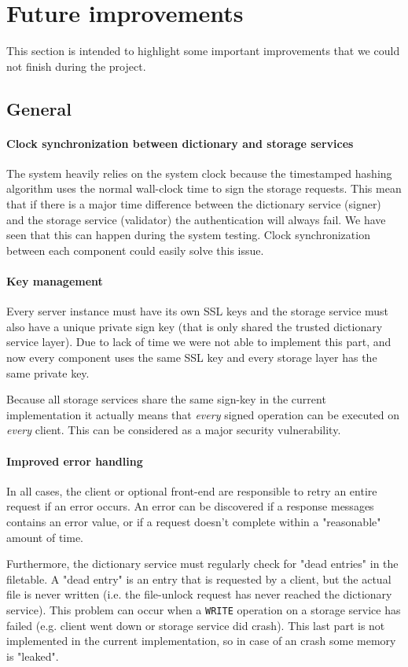 \documentclass[12pt,a4paper]{scrartcl}
\begin{document}
\section{Future improvements}
This section is intended to highlight some important improvements that we could not finish during the project.

\subsection{General}
\paragraph{Clock synchronization between dictionary and storage services}
The system heavily relies on the system clock because the timestamped hashing algorithm uses the normal wall-clock time to sign the storage requests. This mean that if there is a major time difference between the dictionary service (signer) and the storage service (validator) the authentication will always fail. We have seen that this can happen during the system testing. Clock synchronization between each component could easily solve this issue.

\paragraph{Key management}
Every server instance must have its own SSL keys and the storage service must also have a unique private sign key (that is only shared the trusted dictionary service layer). Due to lack of time we were not able to implement this part, and now every component uses the same SSL key and every storage layer has the same private key.

Because all storage services share the same sign-key in the current implementation it actually means that \emph{every} signed operation can be executed on \emph{every} client. This can be considered as a major security vulnerability.

\paragraph{Improved error handling}
In all cases, the client or optional front-end are responsible to retry an entire request if an error occurs. An error can be discovered if a response messages contains an error value, or if a request doesn't complete within a "reasonable" amount of time.

Furthermore, the dictionary service must regularly check for "dead entries" in the filetable. A "dead entry" is an entry that is requested by a client, but the actual file is never written (i.e. the file-unlock request has never reached the dictionary service). This problem can occur when a \verb|WRITE| operation on a storage service has failed (e.g. client went down or storage service did crash). This last part is not implemented in the current implementation, so in case of an crash some memory is "leaked".
\end{document}
